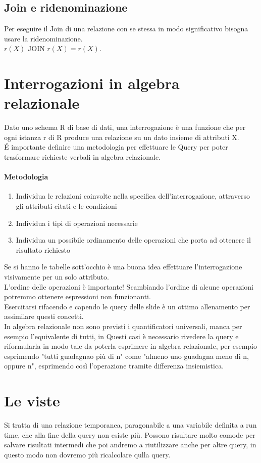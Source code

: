 \subsection*{Join e ridenominazione}
Per eseguire il Join di una relazione con se stessa in modo significativo bisogna usare la
ridenominazione.\\ $r(X) \,\, \text{JOIN} \,\,r(X) = r(X)$.\\

\section{Interrogazioni in algebra relazionale}
Dato uno schema R di base di dati, una interrogazione è una funzione che per ogni istanza r di R
produce una relazione su un dato insieme di attributi X.\\
\'E importante definire una metodologia per effettuare le Query per poter trasformare richieste verbali 
in algebra relazionale.
\paragraph*{Metodologia}
\begin{enumerate}
    \item Individua le relazioni coinvolte nella specifica dell'interrogazione, attraverso gli attributi citati e le
    condizioni
    \item Individua i tipi di operazioni necessarie
    \item Individua un possibile ordinamento delle operazioni che porta ad ottenere il risultato
    richiesto
\end{enumerate}
Se si hanno le tabelle sott'occhio è una buona idea effettuare l'interrogazione visivamente
per un solo attributo.\\
L'ordine delle operazioni è importante! Scambiando l'ordine di alcune operazioni potremmo ottenere
espressioni non funzionanti.\\
Esercitarsi rifacendo e capendo le query delle slide è un ottimo allenamento per assimilare
questi concetti.\\
In algebra relazionale non sono previsti i quantificatori universali, manca per esempio l'equivalente di tutti, in Questi
casi è necessario rivedere la query e riformularla in modo tale da poterla esprimere in algebra relazionale, per esempio
esprimendo "tutti guadagnao più di n" come "almeno uno guadagna meno di n, oppure n", esprimendo
così l'operazione tramite differenza insiemistica.
\section{Le viste}
Si tratta di una relazione temporanea, paragonabile a una variabile definita a run time, che alla fine della
query non esiste più. Possono risultare molto comode per salvare risultati intermedi che poi andremo
a riutilizzare anche per altre query, in questo modo non dovremo più ricalcolare qulla query.
